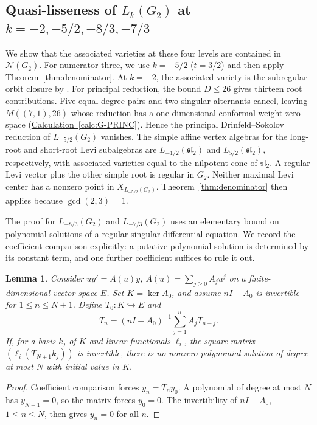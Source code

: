 \documentclass[11pt,a4paper]{amsart}
\numberwithin{equation}{section}
\newtheorem{lemma}[theorem]{Lemma}
\theoremstyle{definition}
\theoremstyle{remark}
\newcommand{\N}{\mathcal N}
\newcommand{\slg}{\mathfrak{sl}}
\begin{document}
\subsection{\texorpdfstring{Quasi-lisseness of $L_k(G_2)$ at $k=-2,-5/2,-8/3,-7/3$}{Quasi-lisseness of Lk(G2) at k=-2,-5/2,-8/3,-7/3}}
We show that the associated varieties at these four levels are contained
in $\N(G_2)$. For numerator three, we use $k=-5/2$ ($t=3/2$)
and then apply Theorem~\ref{thm:denominator}.
At $k=-2$, the associated variety is the subregular orbit closure by
\cite[Theorem~A]{ArakawaEtAl2025}.
For principal reduction, the bound $D\le26$ gives thirteen root contributions.
Five equal-degree pairs and two singular alternants cancel, leaving
$M((7,1),26)$ whose reduction has a one-dimensional conformal-weight-zero space
(\hyperref[calc:G-PRINC]{Calculation~\ref*{calc:G-PRINC}}). Hence the principal Drinfeld--Sokolov reduction of $L_{-5/2}(G_2)$ vanishes.
The simple affine vertex algebras for the long-root and short-root Levi subalgebras
are $L_{-1/2}(\slg_2)$ and $L_{5/2}(\slg_2)$, respectively, with associated varieties
equal to the nilpotent cone of $\slg_2$. A regular
Levi vector plus the other simple root is regular in $G_2$.
Neither maximal Levi center has a nonzero point in
$X_{L_{-5/2}(G_2)}$. Theorem~\ref{thm:denominator} then
applies because $\gcd(2,3)=1$.

The proof for $L_{-8/3}(G_2)$ and $L_{-7/3}(G_2)$ uses an elementary bound on polynomial
solutions of a regular singular differential equation. We record the
coefficient comparison explicitly: a putative polynomial solution is
determined by its constant term, and one further coefficient suffices
to rule it out.

\begin{lemma}\label{vtwo:one-return}
Consider $u y'=A(u)y$, $A(u)=\sum_{j\ge0}A_ju^j$ on a finite-dimensional
vector space $E$. Set $K=\ker A_0$, and assume $nI-A_0$ is invertible for
$1\le n\le N+1$. Define $T_0:K\hookrightarrow E$ and
$$
 T_n=(nI-A_0)^{-1}\sum_{j=1}^n A_jT_{n-j}.
$$
If, for a basis $k_j$ of $K$ and linear functionals $\ell_i$, the
square matrix $(\ell_i(T_{N+1}k_j))$ is invertible, there is no nonzero
polynomial solution of degree at most $N$ with initial value in $K$.
\end{lemma}
\begin{proof}
Coefficient comparison forces $y_n=T_ny_0$. A polynomial of degree
at most $N$ has $y_{N+1}=0$, so the matrix forces $y_0=0$. The invertibility of $nI-A_0$, $1\le n\le N$, then gives
$y_n=0$ for all $n$.
\end{proof}
\end{document}
